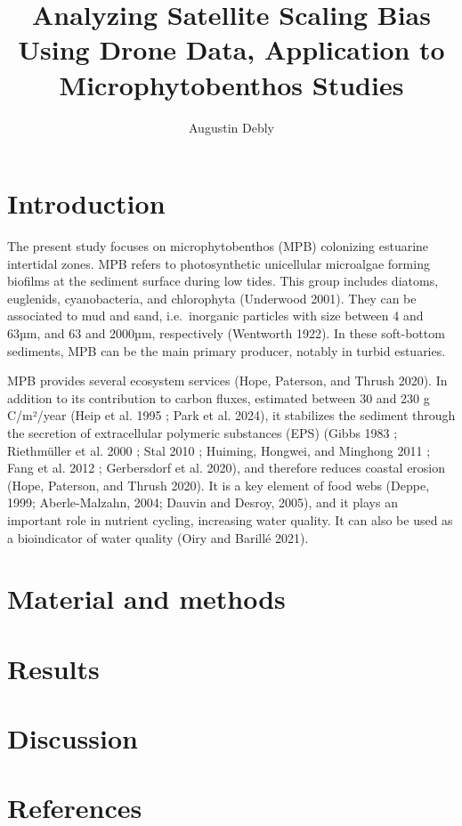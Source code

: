 \documentclass[
  letterpaper,
  DIV=11,
  numbers=noendperiod]{scrartcl}
\title{Analyzing Satellite Scaling Bias Using Drone Data, Application to
Microphytobenthos Studies}
\author{Augustin Debly}
\date{}
\begin{document}
\maketitle

\section{Introduction}\label{introduction}

The present study focuses on microphytobenthos (MPB) colonizing
estuarine intertidal zones. MPB refers to photosynthetic unicellular
microalgae forming biofilms at the sediment surface during low tides.
This group includes diatoms, euglenids, cyanobacteria, and chlorophyta
(Underwood 2001). They can be associated to mud and sand, i.e.~inorganic
particles with size between 4 and 63µm, and 63 and 2000µm, respectively
(Wentworth 1922). In these soft-bottom sediments, MPB can be the main
primary producer, notably in turbid estuaries.

MPB provides several ecosystem services (Hope, Paterson, and Thrush
2020). In addition to its contribution to carbon fluxes, estimated
between 30 and 230 g C/m²/year (Heip et al. 1995 ; Park et al. 2024), it
stabilizes the sediment through the secretion of extracellular polymeric
substances (EPS) (Gibbs 1983 ; Riethmüller et al. 2000 ; Stal 2010 ;
Huiming, Hongwei, and Minghong 2011 ; Fang et al. 2012 ; Gerbersdorf et
al. 2020), and therefore reduces coastal erosion (Hope, Paterson, and
Thrush 2020). It is a key element of food webs (Deppe, 1999;
Aberle-Malzahn, 2004; Dauvin and Desroy, 2005), and it plays an
important role in nutrient cycling, increasing water quality. It can
also be used as a bioindicator of water quality (Oiry and Barillé 2021).

\section{Material and methods}\label{material-and-methods}

\section{Results}\label{results}

\section{Discussion}\label{discussion}

\section*{References}\label{references}
\end{document}
